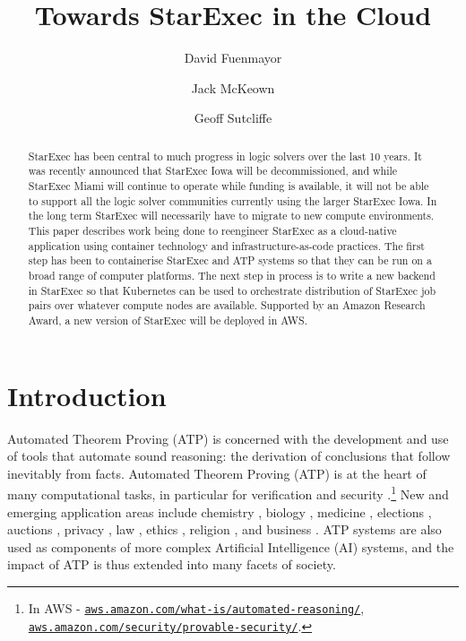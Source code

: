 \documentclass{easychair}
\title{Towards StarExec in the Cloud}
\author{
  David Fuenmayor\inst{1}
\and
  Jack McKeown\inst{2}
\and
  Geoff Sutcliffe\inst{2}
}
\institute{
  University of Bamberg,
  Bamberg, Germany\\
  \email{david.fuenmayor@uni-bamberg.de}
\and
  University of Miami,
  Miami, USA\\
  \email{jam771@miami.edu,geoff@cs.miami.edu}
}
\begin{document}
\maketitle

\begin{abstract}
StarExec has been central to much progress in logic solvers over the last 10 years.
It was recently announced that StarExec Iowa will be decommissioned, and while StarExec Miami 
will continue to operate while funding is available, it will not be able to support all the 
logic solver communities currently using the larger StarExec Iowa. 
In the long term StarExec will necessarily have to migrate to new compute environments.
This paper describes work being done to reengineer StarExec as a cloud-native application using
container technology and infrastructure-as-code practices.
The first step has been to containerise StarExec and ATP systems so that they can be run on a 
broad range of computer platforms. 
The next step in process is to write a new backend in StarExec so that Kubernetes can be used to 
orchestrate distribution of StarExec job pairs over whatever compute nodes are available.
Supported by an Amazon Research Award, a new version of StarExec will be deployed in AWS.
\end{abstract}
\section{Introduction}
\label{Introduction}

Automated Theorem Proving (ATP) is concerned with the development and use of tools that automate 
sound reasoning: the derivation of conclusions that follow inevitably from facts.
Automated Theorem Proving (ATP) is at the heart of many computational tasks, in particular for
verification \cite{Har06,HH19} and security \cite{Coo18}.\footnote{%
In AWS -
\href{https://aws.amazon.com/what-is/automated-reasoning/}{\tt aws.amazon.com/what-is/automated-reasoning/}, 
\href{https://aws.amazon.com/security/provable-security//}{\tt aws.amazon.com/security/provable-security/}.} 
New and emerging application areas include
chemistry \cite{Yad17}, 
biology \cite{CC+13}, 
medicine \cite{HLB05},
elections \cite{Nip09,BDS17}, 
auctions \cite{CK+15}, 
privacy \cite{Lib20},
law \cite{PS15}, 
ethics \cite{DF+16}, 
religion \cite{OZ11,BW14-ECAI,Hor19},
and business \cite{Han98}.
ATP systems are also used as components of more complex Artificial Intelligence (AI) systems,
and the impact of ATP is thus extended into many facets of society.
\end{document}
